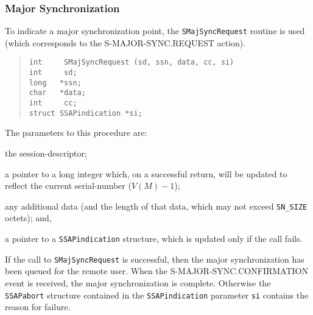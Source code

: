 \subsubsection	{Major Synchronization}
To indicate a major synchronization point,
the \verb"SMajSyncRequest" routine is used
(which corresponds to the {\sf S-MAJOR-SYNC.REQUEST\/} action).
\begin{quote}\small\begin{verbatim}
int     SMajSyncRequest (sd, ssn, data, cc, si)
int     sd;
long   *ssn;
char   *data;
int     cc;
struct SSAPindication *si;
\end{verbatim}\end{quote}
The parameters to this procedure are:
\begin{describe}
\item[\verb"sd":] the session-descriptor;

\item[\verb"ssn":] a pointer to a long integer which,
on a successful return,
will be updated to reflect the current serial-number ($V(M)-1$);

\item[\verb"data"/\verb"cc":] any additional data
(and the length of that data, which may not exceed \verb"SN_SIZE" octets);
and,

\item[\verb"si":] a pointer to a \verb"SSAPindication" structure, which is
updated only if the call fails.
\end{describe}
If the call to \verb"SMajSyncRequest" is successful,
then the major synchronization has been queued for the remote user.
When the {\sf S-MAJOR-SYNC.CON\-FIR\-MA\-TION\/} event is received,
the major synchronization is complete.
Otherwise the \verb"SSAPabort" structure contained in
the \verb"SSAPindication" parameter
\verb"si" contains the reason for failure.

